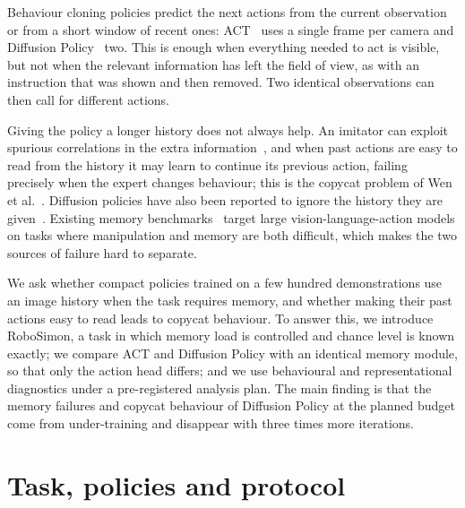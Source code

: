 \documentclass[10pt,a4paper]{article}
\begin{document}
Behaviour cloning policies predict the next actions from the current observation or from a short window of recent ones: ACT~\citep{zhao2023act} uses a single frame per camera and Diffusion Policy~\citep{chi2023diffusion} two. This is enough when everything needed to act is visible, but not when the relevant information has left the field of view, as with an instruction that was shown and then removed. Two identical observations can then call for different actions.

Giving the policy a longer history does not always help. An imitator can exploit spurious correlations in the extra information~\citep{dehaan2019causal}, and when past actions are easy to read from the history it may learn to continue its previous action, failing precisely when the expert changes behaviour; this is the copycat problem of Wen et al.~\citep{wen2020copycat}. Diffusion policies have also been reported to ignore the history they are given~\citep{torne2025ptp}. Existing memory benchmarks~\citep{dai2026robomme} target large vision-language-action models on tasks where manipulation and memory are both difficult, which makes the two sources of failure hard to separate.

We ask whether compact policies trained on a few hundred demonstrations use an image history when the task requires memory, and whether making their past actions easy to read leads to copycat behaviour. To answer this, we introduce RoboSimon, a task in which memory load is controlled and chance level is known exactly; we compare ACT and Diffusion Policy with an identical memory module, so that only the action head differs; and we use behavioural and representational diagnostics under a pre-registered analysis plan. The main finding is that the memory failures and copycat behaviour of Diffusion Policy at the planned budget come from under-training and disappear with three times more iterations.

\section{Task, policies and protocol}
\end{document}

